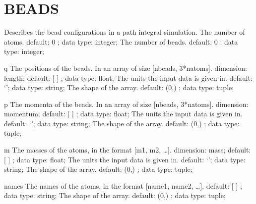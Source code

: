 \section{BEADS}
\label{BEADS}
\begin{ipifield}{}%
{Describes the bead configurations in a path integral simulation.}%
{}%
{%
{The number of atoms.}%
{default:  0 ; data type: integer; }%
%
{The number of beads.}%
{default:  0 ; data type: integer; }%
}
\begin{ipifield}{q}%
{The positions of the beads. In an array of size [nbeads, 3*natoms].}%
{dimension: length; default:  [ ] ; data type: float; }%
{%
{The units the input data is given in.}%
{default: `'; data type: string; }%
%
{The shape of the array.}%
{default:  (0,) ; data type: tuple; }%
}
\end{ipifield}
\begin{ipifield}{p}%
{The momenta of the beads. In an array of size [nbeads, 3*natoms].}%
{dimension: momentum; default:  [ ] ; data type: float; }%
{%
{The units the input data is given in.}%
{default: `'; data type: string; }%
%
{The shape of the array.}%
{default:  (0,) ; data type: tuple; }%
}
\end{ipifield}
\begin{ipifield}{m}%
{The masses of the atoms, in the format [m1, m2, \ldots  ].}%
{dimension: mass; default:  [ ] ; data type: float; }%
{%
{The units the input data is given in.}%
{default: `'; data type: string; }%
%
{The shape of the array.}%
{default:  (0,) ; data type: tuple; }%
}
\end{ipifield}
\begin{ipifield}{names}%
{The names of the atoms, in the format [name1, name2, \ldots  ].}%
{default:  [ ] ; data type: string; }%
{%
{The shape of the array.}%
{default:  (0,) ; data type: tuple; }%
}
\end{ipifield}
\end{ipifield}
